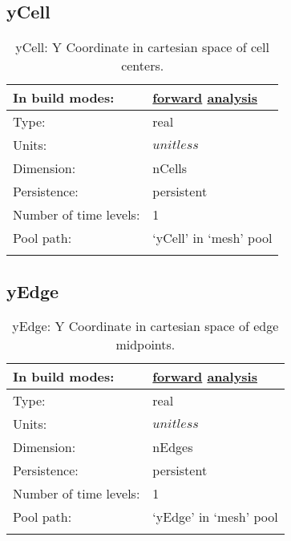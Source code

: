 \subsection[yCell]{yCell}
\label{subsec:var_sec_mesh_yCell}
\begin{center}
\begin{longtable}{| p{2.0in} | p{4.0in} |}
        \hline 
        In build modes: & \hyperref[subsec:forward_var_tab_mesh]{forward} \hyperref[subsec:analysis_var_tab_mesh]{analysis} \\
        \hline 
        Type: & real \\
        \hline 
        Units: & $unitless$ \\
        \hline 
        Dimension: & nCells \\
        \hline 
        Persistence: & persistent \\
        \hline 
        Number of time levels: & 1 \\
        \hline 
            Pool path: & `yCell' in `mesh' pool \\
		 \hline 
    \caption{yCell: Y Coordinate in cartesian space of cell centers.}
\end{longtable}
\end{center}
\subsection[yEdge]{yEdge}
\label{subsec:var_sec_mesh_yEdge}
\begin{center}
\begin{longtable}{| p{2.0in} | p{4.0in} |}
        \hline 
        In build modes: & \hyperref[subsec:forward_var_tab_mesh]{forward} \hyperref[subsec:analysis_var_tab_mesh]{analysis} \\
        \hline 
        Type: & real \\
        \hline 
        Units: & $unitless$ \\
        \hline 
        Dimension: & nEdges \\
        \hline 
        Persistence: & persistent \\
        \hline 
        Number of time levels: & 1 \\
        \hline 
            Pool path: & `yEdge' in `mesh' pool \\
		 \hline 
    \caption{yEdge: Y Coordinate in cartesian space of edge midpoints.}
\end{longtable}
\end{center}
